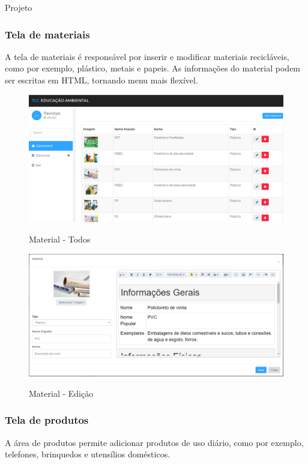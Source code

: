 \documentclass[
	12pt,				%
	openright,			%
	twoside,			%
	a4paper,			%
	english,			%
	french,				%
	spanish,			%
	brazil				%
	]{abntex2}
\begin{document}
\begin{chapter}{Projeto}
\subsubsection{Tela de materiais}
A tela de materiais é responsável por inserir e modificar materiais recicláveis, como por exemplo, plástico, metais e papeis. As informações do material podem ser escritas em HTML, tornando menu mais flexível.
\begin{figure}[h]
\centering
   \caption{Material - Todos}
   \includegraphics[scale=0.45]{media/tela_material_site_1.png}
     \label{fig:tela_material_site_1}
\end{figure}

\begin{figure}[h]
\centering
   \caption{Material - Edição}
   \includegraphics[scale=0.40]{media/tela_material_site_2.png}
     \label{fig:tela_material_site_2}
\end{figure}

\newpage
\subsubsection{Tela de produtos}
A área de produtos permite adicionar produtos de uso diário, como por exemplo, telefones, brinquedos e utensílios domésticos. 


\end{chapter}
\end{document}

